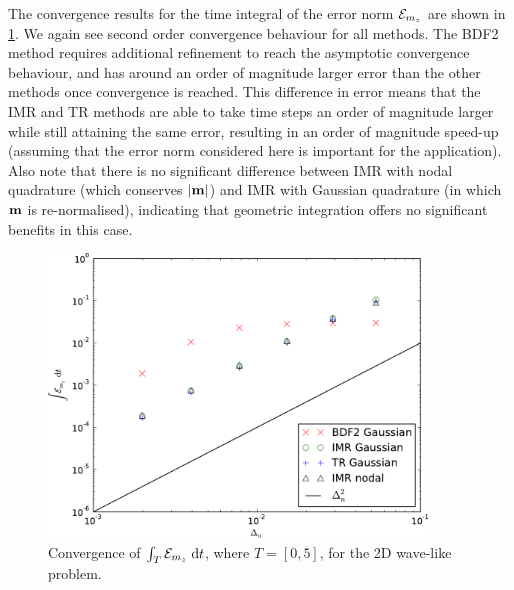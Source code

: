The convergence results for the time integral of the error norm $\mathcal{E}_{m_z}$ are shown in \cref{fig:convergence-long-time-mz-norm}.
We again see second order convergence behaviour for all methods.
The BDF2 method requires additional refinement to reach the asymptotic convergence behaviour, and has around an order of magnitude larger error than the other methods once convergence is reached.
This difference in error means that the IMR and TR methods are able to take time steps an order of magnitude larger while still attaining the same error, resulting in an order of magnitude speed-up (assuming that the error norm considered here is important for the application).
Also note that there is no significant difference between IMR with nodal quadrature (which conserves $\left|{\boldsymbol{\mathrm{m}}} \right|$) and IMR with Gaussian quadrature (in which $\boldsymbol{\mathrm{m}}$ is re-normalised), indicating that geometric integration offers no significant benefits in this case.
\begin{figure}
  \centering
  \includegraphics[width=0.9\textwidth]{plots/2d_wave_solution_convergence_long_time/auxerr1integralvsfakemeanofdts.pdf}
  \caption{Convergence of ${\int_T {\mathcal{E}_{m_z}} {\; \mathrm{{d}}} t}$, where $T=[0,5]$, for the 2D wave-like problem.
  }
  \label{fig:convergence-long-time-mz-norm}
\end{figure}

